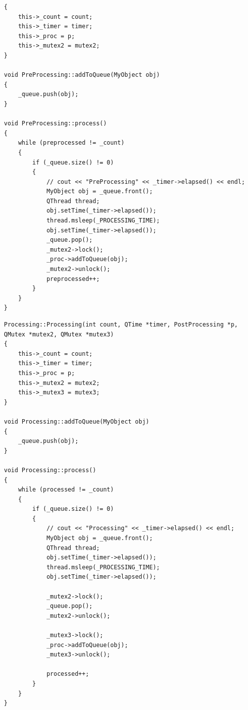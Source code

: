         \begin{lstlisting}[label=lst:pre, caption=Реализация класса PreProcessing]
{
    this->_count = count;
    this->_timer = timer;
    this->_proc = p;
    this->_mutex2 = mutex2;
}

void PreProcessing::addToQueue(MyObject obj)
{
    _queue.push(obj);
}

void PreProcessing::process()
{
    while (preprocessed != _count)
    {
        if (_queue.size() != 0)
        {
            // cout << "PreProcessing" << _timer->elapsed() << endl;
            MyObject obj = _queue.front();
            QThread thread;
            obj.setTime(_timer->elapsed());
            thread.msleep(_PROCESSING_TIME);
            obj.setTime(_timer->elapsed());
            _queue.pop();
            _mutex2->lock();
            _proc->addToQueue(obj);
            _mutex2->unlock();
            preprocessed++;
        }
    }
}
        \end{lstlisting}

\begin{lstlisting}[label=lst:pro, caption=Реализация класса Processing]
Processing::Processing(int count, QTime *timer, PostProcessing *p, QMutex *mutex2, QMutex *mutex3)
{
    this->_count = count;
    this->_timer = timer;
    this->_proc = p;
    this->_mutex2 = mutex2;
    this->_mutex3 = mutex3;
}

void Processing::addToQueue(MyObject obj)
{
    _queue.push(obj);
}

void Processing::process()
{
    while (processed != _count)
    {
        if (_queue.size() != 0)
        {
            // cout << "Processing" << _timer->elapsed() << endl;
            MyObject obj = _queue.front();
            QThread thread;
            obj.setTime(_timer->elapsed());
            thread.msleep(_PROCESSING_TIME);
            obj.setTime(_timer->elapsed());

            _mutex2->lock();
            _queue.pop();
            _mutex2->unlock();

            _mutex3->lock();
            _proc->addToQueue(obj);
            _mutex3->unlock();

            processed++;
        }
    }
}
\end{lstlisting}

